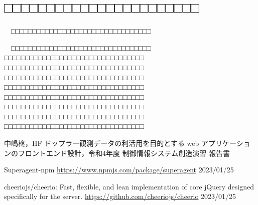 \section{□□□□□□□□□□□□□□□□□□□□□□□}
　□□□□□□□□□□□□□□□□□□□□□□□□□□□□□□□□□\cite{shu_sotsuken}

　□□□□□□□□□□□□□□□□□□□□□□□□□□□□□□□□□
□□□□□□□□□□□□□□□□□□□□□□□□□□□□□□□□□
□□□□□□□□□□□□□□□□□□□□□□□□□□□□□□□□□
□□□□□□□□□□□□□□□□□□□□□□□□□□□□□□□□□
□□□□□□□□□□□□□□□□□□□□□□□□□□□□□□□□□
□□□□□□□□□□□□□□□□□□□□□□□□□□□□□□□□□
□□□□□□□□□□□□□□□□□□□□□□□□□□□□□□□□□
□□□□□□□□□□□□□□□□□□□□□□□□□□□□□□□□□
□□□□□□□□□□□□□□□□□□□□□□□□□□□□□□□□□

\small
\begin{thebibliography}{99}
\setlength{\itemsep}{0pt}
\smallskip

中嶋柊，HF ドップラー観測データの利活用を目的とする web アプリケーションのフロントエンド設計，令和4年度 制御情報システム創造演習 報告書

Superagent-npm 
\url{https://www.npmjs.com/package/superagent}  2023/01/25

cheeriojs/cheerio: Fast, flexible, and lean implementation of core jQuery designed specifically for the server. 
\url{https://github.com/cheeriojs/cheerio}  2023/01/25 

\end{thebibliography}
\normalsize

